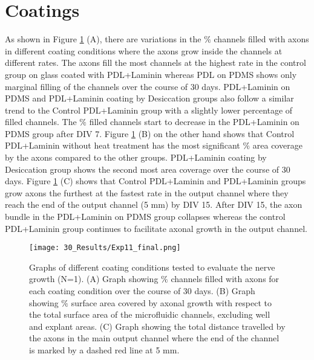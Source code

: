 \section{Coatings}
\label{ch:Results}

As shown in Figure \ref{fig:CoatingResults1} (A), there are variations in the $\%$ channels filled with axons in different coating conditions where the axons grow inside the channels at different rates. The axons fill the most channels at the highest rate in the control group on glass coated with PDL+Laminin whereas PDL on PDMS shows only marginal filling of the channels over the course of 30 days. PDL+Laminin on PDMS and PDL+Laminin coating by Desiccation groups also follow a similar trend to the Control PDL+Laminin group with a slightly lower percentage of filled channels. The $\%$ filled channels start to decrease in the PDL+Laminin on PDMS group after DIV 7. Figure \ref{fig:CoatingResults1} (B) on the other hand shows that Control PDL+Laminin without heat treatment has the most significant $\%$ area coverage by the axons compared to the other groups. PDL+Laminin coating by Desiccation group shows the second most area coverage over the course of 30 days. Figure \ref{fig:CoatingResults1} (C) shows that Control PDL+Laminin and PDL+Laminin groups grow axons the furthest at the fastest rate in the output channel where they reach the end of the output channel (5 mm) by DIV 15. After DIV 15, the axon bundle in the PDL+Laminin on PDMS group collapses whereas the control PDL+Laminin group continues to facilitate axonal growth in the output channel. 

\begin{figure}[H]
\centering
\texttt{[image: 30\_Results/Exp11\_final.png]}
\caption{Graphs of different coating conditions tested to evaluate the nerve growth (N=1). (A) Graph showing $\%$ channels filled with axons for each coating condition over the course of 30 days. (B) Graph showing $\%$ surface area covered by axonal growth with respect to the total surface area of the microfluidic channels, excluding well and explant areas. (C) Graph showing the total distance travelled by the axons in the main output channel where the end of the channel is marked by a dashed red line at 5 mm. }
\label{fig:CoatingResults1}
\end{figure}

